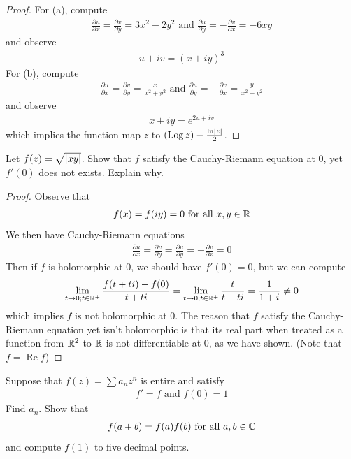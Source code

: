 \documentclass{report}
\begin{document}
\begin{proof}
For (a), compute 
\begin{align*}
\frac{\partial u}{\partial x}=\frac{\partial v}{\partial y}=3x^2-2y^2\text{ and }\frac{\partial u}{\partial y}= -\frac{\partial v}{\partial x}=-6xy
\end{align*}
and observe 
\begin{align*}
u+iv=(x+iy)^3
\end{align*}
For (b), compute 
\begin{align*}
\frac{\partial u}{\partial x}= \frac{\partial v}{\partial y} = \frac{x}{x^2+y^2}\text{ and } \frac{\partial u}{\partial y}=-\frac{\partial v}{\partial x}= \frac{y}{x^2+y^2}
\end{align*}
and observe 
\begin{align*}
x+iy=e^{2u+iv}
\end{align*}
which implies the function map $z$ to  $(\operatorname{Log}z)- \frac{\ln \left|z\right|}{2}$. 
\end{proof}
\begin{question}{}{}
Let $f(z)=\sqrt{\left|xy\right|}$. Show that  $f$ satisfy the Cauchy-Riemann equation at $0$, yet  $f'(0)$ does not exists. Explain why. 
\end{question}
\begin{proof}
Observe that 
\begin{align*}
f(x)=f(iy)=0\text{ for all }x,y\in\mathbb{R}
\end{align*}
We then have Cauchy-Riemann equations  
\begin{align*}
\frac{\partial u}{\partial x}=\frac{\partial v}{\partial  y}= \frac{\partial u}{\partial y}= - \frac{\partial v}{\partial x}=0
\end{align*}
Then if $f$ is holomorphic at $0$, we should have  $f'(0)=0$, but we can compute 
\begin{align*}
\lim_{t\to 0;t\in\mathbb{R}^+} \frac{f(t+ti)-f(0)}{t+ti}=\lim_{t\to 0;t\in\mathbb{R}^+} \frac{t}{t+ti}=  \frac{1}{1+i}\neq 0
\end{align*}
which implies $f$ is not holomorphic at $0$. The reason that $f$ satisfy the Cauchy-Riemann equation yet isn't holomorphic is that its real part when treated as a function from $\mathbb{R}^2$ to $\mathbb{R}$ is not differentiable at $0$, as we have shown. (Note that $f=\operatorname{Re}f$) 
\end{proof}
\begin{question}{}{}
Suppose that $f(z)=\sum a_nz^n$ is entire and satisfy 
\begin{align*}
f'=f\text{ and }f(0)=1
\end{align*}
Find $a_n$. Show that 
\begin{align*}
f(a+b)=f(a)f(b)\text{ for all }a,b \in\mathbb{C}
\end{align*}
and compute $f(1)$ to five decimal points. 
\end{question}
\end{document}
